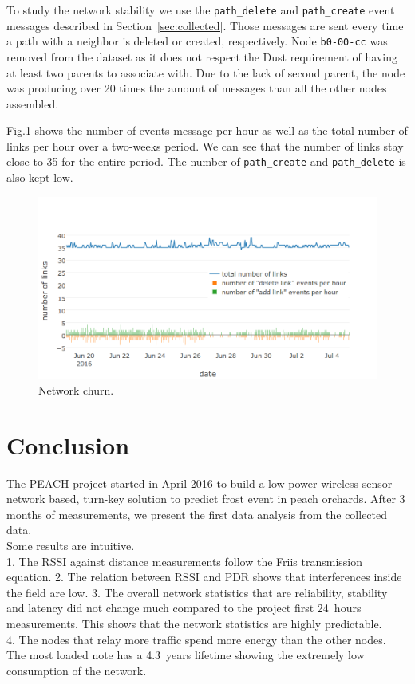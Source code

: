 \documentclass{sig-alternate}
\newcommand{\pathcreate}          {{\tt path\_create}\xspace}
\newcommand{\pathdelete}          {{\tt path\_delete}\xspace}
\begin{document}

To study the network stability we use the \pathdelete and \pathcreate event messages described in Section~\ref{sec:collected}.
Those messages are sent every time a path with a neighbor is deleted or created, respectively.
Node {\tt b0-00-cc} was removed from the dataset as it does not respect the Dust requirement of having at least two parents to associate with.
Due to the lack of second parent, the node was producing over 20 times the amount of messages than all the other nodes assembled.


Fig.\ref{fig:net_churn} shows the number of events message per hour as well as the total number of links per hour over a two-weeks period.
We can see that the number of links stay close to 35 for the entire period.
The number of \pathcreate and \pathdelete is also kept low.

\begin{figure}
    \centering
    \includegraphics[width=\columnwidth]{net_churn}
    \caption{Network churn.}
    \label{fig:net_churn}
\end{figure}

\section{Conclusion}
\label{sec:conclusion}

The PEACH project started in April 2016 to build a low-power wireless sensor network based, turn-key solution to predict frost event in peach orchards.
After 3 months of measurements, we present the first data analysis from the collected data.\\

Some results are intuitive.\\
1. The RSSI against distance measurements follow the Friis transmission equation.
2. The relation between RSSI and PDR shows that interferences inside the field are low.
3. The overall network statistics that are reliability, stability and latency did not change much compared to the project first 24~hours measurements.
This shows that the network statistics are highly predictable.\\
4. The nodes that relay more traffic spend more energy than the other nodes.
The most loaded note has a 4.3~years lifetime showing the extremely low consumption of the network.\\
\end{document}
